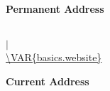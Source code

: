 \begin{multicols}{3}
 \begin{flushleft}
  \null
  \vspace{-0.25\baselineskip}

  \textbf{Permanent Address}\\
 \end{flushleft}

 \begin{center}
  {\fontsize{25pt}{30pt}\selectfont \textbf{}}\\
   $\mid$ \\
  \url{\VAR{basics.website}}\\
 \end{center}

 \begin{flushright}
  \null
  \vspace{-0.25\baselineskip}

  \textbf{Current Address}\\
 \end{flushright}
\end{multicols}
\phantom{}
